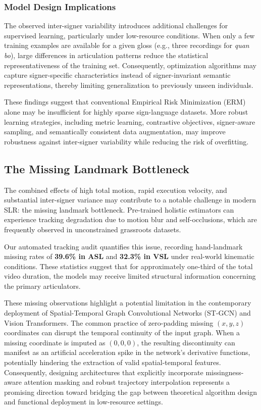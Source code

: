 \documentclass{ieeeaccess}
\DeclareRobustCommand{\textbf}[1]{{\bfseries #1}}
\begin{document}
\subsubsection{Model Design Implications}

The observed inter-signer variability introduces additional challenges for supervised learning, particularly under low-resource conditions. When only a few training examples are available for a given gloss (e.g., three recordings for \emph{quan bo}), large differences in articulation patterns reduce the statistical representativeness of the training set. Consequently, optimization algorithms may capture signer-specific characteristics instead of signer-invariant semantic representations, thereby limiting generalization to previously unseen individuals.

These findings suggest that conventional Empirical Risk Minimization (ERM) alone may be insufficient for highly sparse sign-language datasets. More robust learning strategies, including metric learning, contrastive objectives, signer-aware sampling, and semantically consistent data augmentation, may improve robustness against inter-signer variability while reducing the risk of overfitting.

\subsection{The Missing Landmark Bottleneck}
\label{sec:missing_landmarks}

The combined effects of high total motion, rapid execution velocity, and substantial inter-signer variance may contribute to a notable challenge in modern SLR: the missing landmark bottleneck. Pre-trained holistic estimators can experience tracking degradation due to motion blur and self-occlusions, which are frequently observed in unconstrained grassroots datasets.

Our automated tracking audit quantifies this issue, recording hand-landmark missing rates of \textbf{39.6\% in ASL} and \textbf{32.3\% in VSL} under real-world kinematic conditions. These statistics suggest that for approximately one-third of the total video duration, the models may receive limited structural information concerning the primary articulators.

These missing observations highlight a potential limitation in the contemporary deployment of Spatial-Temporal Graph Convolutional Networks (ST-GCN) and Vision Transformers. The common practice of zero-padding missing $(x,y,z)$ coordinates can disrupt the temporal continuity of the input graph. When a missing coordinate is imputed as $(0,0,0)$, the resulting discontinuity can manifest as an artificial acceleration spike in the network's derivative functions, potentially hindering the extraction of valid spatial-temporal features. Consequently, designing architectures that explicitly incorporate missingness-aware attention masking and robust trajectory interpolation represents a promising direction toward bridging the gap between theoretical algorithm design and functional deployment in low-resource settings.
\end{document}
